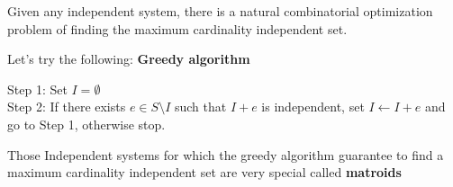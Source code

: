			Given any independent system, there is a natural combinatorial optimization problem of finding the maximum cardinality independent set. 

			Let's try the following: \textbf{Greedy algorithm}

			Step 1: Set $I=\emptyset$\\
			Step 2: If there exists $e\in S \setminus I$ such that $I + e$ is independent, set $I \leftarrow I+e$ and go to Step 1, otherwise stop.

			Those Independent systems for which the greedy algorithm guarantee to find a maximum cardinality independent set are very special called \textbf{matroids}

			